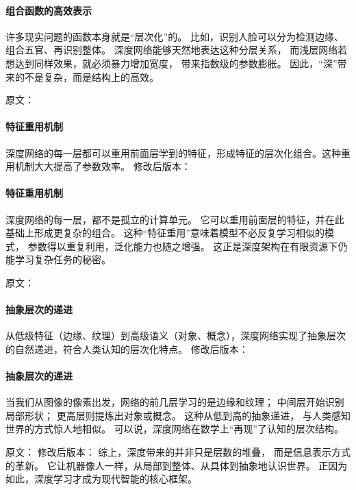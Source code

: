 \paragraph{组合函数的高效表示}  
许多现实问题的函数本身就是“层次化”的。  
比如，识别人脸可以分为检测边缘、组合五官、再识别整体。  
深度网络能够天然地表达这种分层关系，  
而浅层网络若想达到同样效果，就必须暴力增加宽度，  
带来指数级的参数膨胀。  
因此，“深”带来的不是复杂，而是结构上的高效。  



原文：
\paragraph{特征重用机制}
深度网络的每一层都可以重用前面层学到的特征，形成特征的层次化组合。这种重用机制大大提高了参数效率。
修改后版本：
\paragraph{特征重用机制}  
深度网络的每一层，都不是孤立的计算单元。  
它可以重用前面层的特征，并在此基础上形成更复杂的组合。  
这种“特征重用”意味着模型不必反复学习相似的模式，  
参数得以重复利用，泛化能力也随之增强。  
这正是深度架构在有限资源下仍能学习复杂任务的秘密。  



原文：
\paragraph{抽象层次的递进}
从低级特征（边缘、纹理）到高级语义（对象、概念），深度网络实现了抽象层次的自然递进，符合人类认知的层次化特点。
修改后版本：
\paragraph{抽象层次的递进}  
当我们从图像的像素出发，网络的前几层学习的是边缘和纹理；  
中间层开始识别局部形状；  
更高层则提炼出对象或概念。  
这种从低到高的抽象递进，  
与人类感知世界的方式惊人地相似。  
可以说，深度网络在数学上“再现”了认知的层次结构。  



原文：
修改后版本：
综上，深度带来的并非只是层数的堆叠，  
而是信息表示方式的革新。  
它让机器像人一样，从局部到整体、从具体到抽象地认识世界。  
正因为如此，深度学习才成为现代智能的核心框架。

